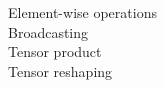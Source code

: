\documentclass[preview]{standalone}
\begin{document}
Element-wise operations\\Broadcasting\\Tensor product\\Tensor reshaping\\
\end{document}
